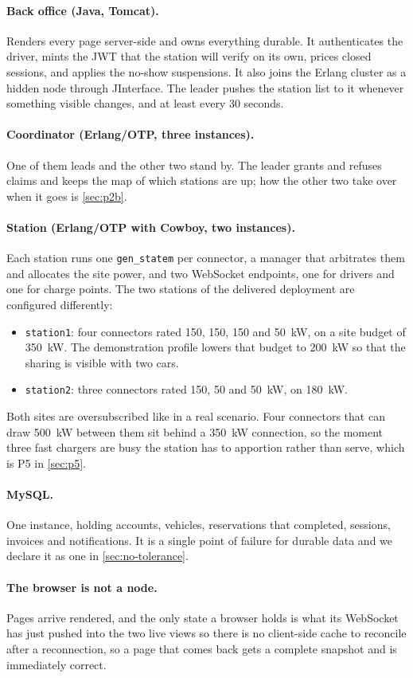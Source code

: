 \paragraph{Back office (Java, Tomcat).} Renders every page server-side and owns everything
durable. It authenticates the driver, mints the JWT that the station will verify on its own,
prices closed sessions, and applies the no-show suspensions. It also joins the Erlang
cluster as a hidden node through JInterface. The leader pushes the station list to it
whenever something visible changes, and at least every 30 seconds.

\paragraph{Coordinator (Erlang/OTP, three instances).} One of them leads and the other two
stand by. The leader grants and refuses claims and keeps the map of which stations are up;
how the other two take over when it goes is \cref{sec:p2b}.

\paragraph{Station (Erlang/OTP with Cowboy, two instances).} Each station runs one
\texttt{gen\_statem} per connector, a manager that arbitrates them and allocates the site
power, and two WebSocket endpoints, one for drivers and one for charge points. The two
stations of the delivered deployment are configured differently:

\begin{itemize}
  \item \texttt{station1}: four connectors rated 150, 150, 150 and 50~kW, on a site budget
        of 350~kW. The demonstration profile lowers that budget to 200~kW so that the
        sharing is visible with two cars.
  \item \texttt{station2}: three connectors rated 150, 50 and 50~kW, on 180~kW.
\end{itemize}

Both sites are oversubscribed like in a real scenario. Four connectors that can draw 500~kW
between them sit behind a 350~kW connection, so the moment three fast chargers are busy the
station has to apportion rather than serve, which is P5 in \cref{sec:p5}.

\paragraph{MySQL.} One instance, holding accounts, vehicles, reservations that completed,
sessions, invoices and notifications. It is a single point of failure for durable data and
we declare it as one in \cref{sec:no-tolerance}.

\paragraph{The browser is not a node.} Pages arrive rendered, and the only state a browser
holds is what its WebSocket has just pushed into the two live views so there is no client-side cache to reconcile after a reconnection, so a page
that comes back gets a complete snapshot and is immediately correct.
